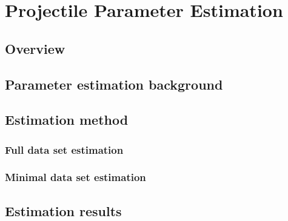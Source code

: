 
\chapter{Projectile Parameter Estimation}
\label{ch.ParameterEstimation}

\section{Overview}

\section{Parameter estimation background}

\section{Estimation method}
\subsection{Full data set estimation}
\subsection{Minimal data set estimation}

\section{Estimation results}